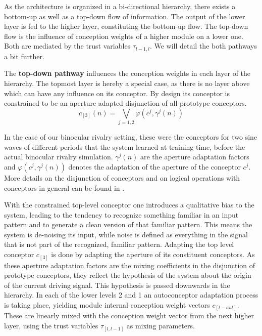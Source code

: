 \documentclass[utf8]{frontiersSCNS} %
\begin{document}
    As the architecture is organized in a bi-directional hierarchy, there exists a bottom-up as well as a top-down flow of information. 
    The output of the lower layer is fed to the higher layer, constituting the bottom-up flow. The top-down flow is the influence of 
    conception weights of a higher module on a lower one. 
    Both are mediated by the trust variables $\tau_{l-1,l}$. We will detail the both pathways a bit further.
    
    The \textbf{top-down pathway} influences the conception weights in each layer of the hierarchy. The topmost layer is hereby a special case, as there is no layer above which can have any influence on its conceptor. By design its conceptor is constrained to be an aperture adapted disjunction of all prototype conceptors. 
    \begin{equation}
       c_{[3]}(n) = \bigvee\limits_{j = 1, 2} \varphi(c^j , \gamma^j (n))
    \end{equation}
    
    In the case of our binocular rivalry setting, these were the conceptors for two sine waves of different periods that the system learned at training time, before the actual binocular rivalry simulation. $\gamma^j (n)$ are the aperture adaptation factors and $\varphi(c^j , \gamma^j (n))$ denotes the adaptation of the aperture of the conceptor $c^j$. More details on the disjunction of conceptors and on logical operations with conceptors in general can be found in \cite{Jaeger2014}. 
    
    With the constrained top-level conceptor one introduces a qualitative bias to the system, leading to the tendency to recognize something 
    familiar in an input pattern and to generate a clean version of that familiar pattern. This means the system is de-noising its input, 
    while noise is defined as everything in the signal that is not part of the recognized, familiar pattern. 
    Adapting the top level conceptor $c_{[3]}$ is done by adapting the aperture of its constituent conceptors. As these aperture adaptation factors are the mixing coefficients in the disjunction of prototype conceptors, they reflect the hypothesis of the system about the origin of the current driving signal. 
    This hypothesis is passed downwards in the hierarchy. In each of the lower levels 2 and 1 an autoconceptor adaptation process is taking place, yielding module internal conception weight vectors $c_{[l-aut]}$. These are linearly mixed with the conception weight vector from the next higher layer, using the trust variables $\tau_{[l,l-1]}$ as mixing parameters. 
    
\end{document}
